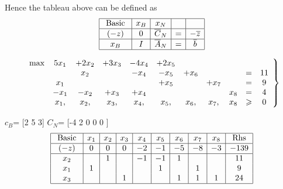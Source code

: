 \documentclass{article}
\begin{document}
Hence the tableau above can be defined as
$$
\begin{array} { | c | c | c | c | c | } \hline \text { Basic } & { x _ { B } } & { x _ { N } } & { }& \\ \hline ( - z ) & { 0 } & { \overline { C } _ { N } } & { = }&{ - \overline { z } } \\ \hline x _ { B } & { I } & { \overline { A } _ { N } } & { = }&{ \overline { b } } \\ \hline \end{array}
  $$

  $$
\left.\begin{array} { r c c c c c  c c c c c c } { \max } & { 5 x _ { 1 } } & { + 2 x _ { 2 } } & { + 3 x _ { 3 } } & { - 4 x _ { 4 } } & { + 2 x _ { 5 } }&&& \\ { } & &{ x _ { 2 } } & { } & { - x _ { 4 } } & { - x _ { 5 } } & { + x _ { 6 } } &&& { = } & { 11 } \\ &{ x _ { 1 } } & { } & { } & { } & { + x _ { 5 } } && { + x _ { 7 } } & { } & { =}&{ 9 } \\ &{ - x _ { 1 } } & { - x _ { 2 } } & { + x _ { 3 } } & { + x _ { 4 } } & { } & { } && { x _ { 8 } } & { =}&{ 4 } \\& { x _ { 1 } , } & { x _ { 2 } , } & { x _ { 3 } , } & { x _ { 4 } , } & { x _ { 5 } , } & { x _ { 6 } , } & { x _ { 7 } , } & { x _ { 8 } } & { \geqslant}&{ 0 } \end{array} \right\}
$$

$c_B$= [2 5 3] $C_N$= [-4 2 0 0 0 ]
$$
\begin{array} { | c | c | c | c | c | c | c | c | c | c |} \hline \text { Basic } & { x _ { 1 } } & { x _ { 2 } } & { x _ { 3 } } & { x _ { 4 } } & { x _ { 5 } } & { x _ { 6 } } & { x _ { 7 } } & { x _ { 8 } } & { \text { Rhs } } \\ \hline ( - z ) & { 0 } & { 0 } & { 0 } & { - 2 } & { - 1 } & { - 5 } & { - 8 } & { - 3 } & { - 139 } \\ \hline x _ { 2 } & { } & { 1 } & { } & { - 1 } & { -1 } & {1 } & &&{ 11 } \\ { x _ { 1 } } & { 1 } & { } & { } && { 1 } & { } & { 1 } & {  } & { 9 } \\ { x_3}&&&{1}&&&{1}&{1}&{1}&{24}\\ \hline \end{array}
$$
\end{document}
